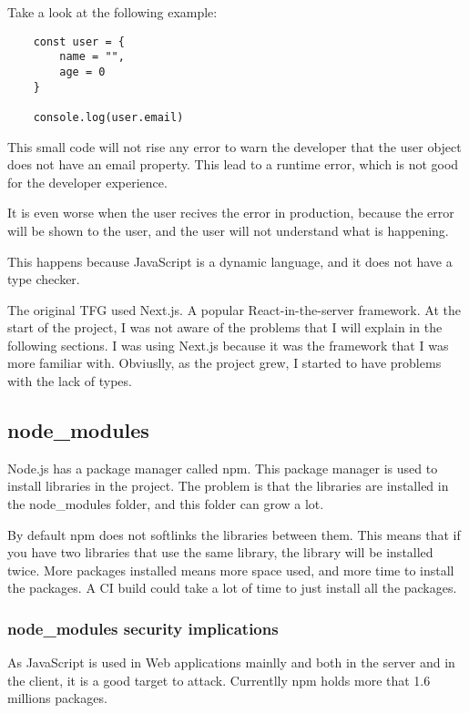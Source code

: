 \documentclass[12pt, letterpaper]{article}
\begin{document}
\begin{multicols}{2}
    Take a look at the following example:
    \begin{lstlisting}
    const user = {
        name = "",
        age = 0
    }

    console.log(user.email)
    \end{lstlisting}

    This small code will not rise any error to warn the developer that the user object does not have an email property. This lead to a runtime error, which is not good for the developer experience.

    It is even worse when the user recives the error in production, because the error will be shown to the user, and the user will not understand what is happening.

    This happens because JavaScript is a dynamic language, and it does not have a type checker.

    The original TFG used Next.js. A popular React-in-the-server framework. At the start of the project, I was not aware of the problems that I will explain in the following sections. I was using Next.js because it was the framework that I was more familiar with. Obviuslly, as the project grew, I started to have problems with the lack of types.

    \subsection{node\_modules}

    Node.js has a package manager called npm. This package manager is used to install libraries in the project. The problem is that the libraries are installed in the node\_modules folder, and this folder can grow a lot.

    By default npm does not softlinks the libraries between them. This means that if you have two libraries that use the same library, the library will be installed twice. More packages installed means more space used, and more time to install the packages. A CI build could take a lot of time to just install all the packages.

    \subsubsection{node\_modules security implications}

    As JavaScript is used in Web applications mainlly and both in the server and in the client, it is a good target to attack. Currentlly npm holds more that 1.6 millions packages.


\end{multicols}
\end{document}
